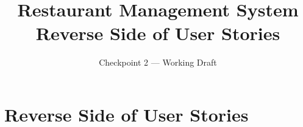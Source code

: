 \documentclass[11pt,a4paper]{article}
\title{Restaurant Management System\\Reverse Side of User Stories}
\author{Checkpoint 2 --- Working Draft}
\date{}
\begin{document}
\maketitle
\section{Reverse Side of User Stories}









\end{document}

